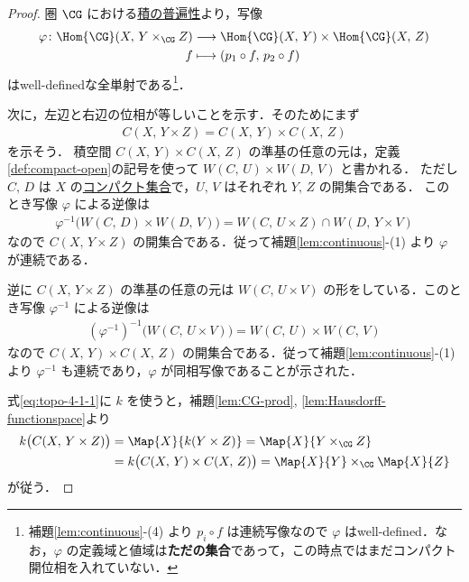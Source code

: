 \documentclass[algtopo_main]{subfiles}
\begin{document}
\begin{proof}
    圏 $\CG$ における\hyperref[prop:CG-product-univ]{積の普遍性}より，写像
    \begin{align}
        \varphi \colon \Hom{\CG}(X,\, Y \times_{\CG} Z) &\lto \Hom{\CG}(X,\, Y) \times \Hom{\CG}(X,\, Z) \\
        f &\lmto (p_1 \circ f,\, p_2 \circ f)
    \end{align}
    はwell-definedな全単射である\footnote{補題\ref{lem:continuous}-(4) より $p_i \circ f$ は連続写像なので $\varphi$ はwell-defined．なお，$\varphi$ の定義域と値域は\textbf{ただの集合}であって，この時点ではまだコンパクト開位相を入れていない．}．
    
    次に，左辺と右辺の位相が等しいことを示す．そのためにまず
    \begin{align}
        \label{eq:topo-4-1-1}
        C(X,\, Y \times Z) = C(X,\, Y) \times C(X,\, Z)
    \end{align}
    を示そう．
    積空間 $C(X,\, Y) \times C(X,\, Z)$ の準基の任意の元は，定義\ref{def:compact-open}の記号を使って $W(C,\, U) \times W(D,\, V)$ と書かれる．
    ただし $C,\, D$ は $X$ の\hyperref[def:compact]{コンパクト集合}で，$U,\, V$ はそれぞれ $Y,\, Z$ の開集合である．
    このとき写像 $\varphi$ による逆像は 
    \begin{align}
        \varphi^{-1} \bigl( W(C,\, D) \times W(D,\, V) \bigr) = W(C,\, U \times Z) \cap W(D,\, Y \times V)
    \end{align}
    なので $C(X,\, Y \times Z)$ の開集合である．従って補題\ref{lem:continuous}-(1) より $\varphi$ が連続である．

    逆に $C(X,\, Y \times Z)$ の準基の任意の元は $W(C,\, U \times V)$ の形をしている．このとき写像 $\varphi^{-1}$ による逆像は
    \begin{align}
        (\varphi^{-1})^{-1} \bigl( W(C,\, U \times V) \bigr) = W(C,\, U) \times W(C,\, V)
    \end{align}
    なので $C(X,\, Y) \times C(X,\, Z)$ の開集合である．従って補題\ref{lem:continuous}-(1) より $\varphi^{-1}$ も連続であり，$\varphi$ が同相写像であることが示された．

    式\eqref{eq:topo-4-1-1}に $k$ を使うと，補題\ref{lem:CG-prod}, \ref{lem:Hausdorff-functionspace}より
    \begin{align}
        k \bigl( C(X,\, Y \times Z) \bigr) &= \Map{X}{k(Y \times Z)} = \Map{X}{Y \times_{\CG} Z} \\
        &= k \bigl( C(X,\, Y) \times C(X,\, Z) \bigr) = \Map{X}{Y} \times_{\CG} \Map{X}{Z}
    \end{align}
    が従う．
\end{proof}
\end{document}

